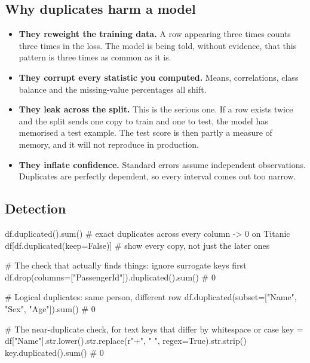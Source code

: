 \documentclass[11pt,a4paper]{article}
\begin{document}

\subsection{Why duplicates harm a model}

\begin{itemize}\itemsep3pt
  \item \textbf{They reweight the training data.} A row appearing three times counts three
        times in the loss. The model is being told, without evidence, that this pattern is
        three times as common as it is.
  \item \textbf{They corrupt every statistic you computed.} Means, correlations, class
        balance and the missing-value percentages all shift.
  \item \textbf{They leak across the split.} This is the serious one. If a row exists twice
        and the split sends one copy to train and one to test, the model has memorised a
        test example. The test score is then partly a measure of memory, and it will not
        reproduce in production.
  \item \textbf{They inflate confidence.} Standard errors assume independent observations.
        Duplicates are perfectly dependent, so every interval comes out too narrow.
\end{itemize}

\subsection{Detection}

\begin{py}
df.duplicated().sum()          # exact duplicates across every column -> 0 on Titanic
df[df.duplicated(keep=False)]  # show every copy, not just the later ones

# The check that actually finds things: ignore surrogate keys first
df.drop(columns=["PassengerId"]).duplicated().sum()      # 0

# Logical duplicates: same person, different row
df.duplicated(subset=["Name", "Sex", "Age"]).sum()       # 0

# The near-duplicate check, for text keys that differ by whitespace or case
key = df["Name"].str.lower().str.replace(r"\s+", " ", regex=True).str.strip()
key.duplicated().sum()                                   # 0
\end{py}
\end{document}
